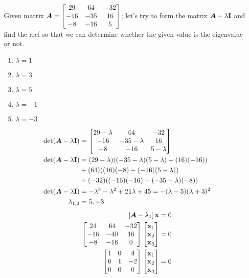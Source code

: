\documentclass{article}
\begin{document}
Given matrix $ \matr{A} = \begin{bmatrix} 29 & 64 & -32 \\ -16 & -35 & 16 \\ -8 & -16 & 5 \end{bmatrix} $; let's try to form the matrix $ \matr{A} - \lambda \vect{I} $ and find the rref so that we can determine whether the given value is the eigenvalue or not.
\begin{enumerate}[label = \textbf{\arabic*)}]
	\item $ \lambda = 1 $
	\item $ \lambda = 3 $
	\item $ \lambda = 5 $
	\item $ \lambda = -1 $
	\item $ \lambda = -3 $
\end{enumerate}
\hr
\begin{align*}
	\det( \matr{A} - \lambda \vect{I} ) & =
		\begin{bmatrix}
			29 - \lambda & 64 & -32 \\
			-16 & -35 - \lambda & 16 \\
			-8 & -16 & 5 - \lambda
		\end{bmatrix} \\
	\det( \matr{A} - \lambda \vect{I} )
		& = (29 - \lambda)( (-35 - \lambda)(5 - \lambda) - (16)(-16) ) \\
		& + (64)( (16)(-8) - (-16)(5 - \lambda) ) \\
		& + (-32)( (-16)(-16) - (-35 - \lambda)(-8) ) \\
	\det( \matr{A} - \lambda \vect{I} ) & =
		-\lambda^3 - \lambda^2 + 21\lambda + 45 = -(\lambda - 5)(\lambda + 3)^2 \\
	\lambda_{1,2} & = 5, -3
\end{align*}
\begin{align*}
	\left[ \matr{A} - \lambda_1 \right] \vect{x} & = 0 \\
	\begin{bmatrix}
		24 & 64 & -32 \\
		-16 & -40 & 16 \\
		-8 & -16 & 0
	\end{bmatrix}
	\begin{bmatrix} \vect{x}_1 \\ \vect{x}_2 \\ \vect{x}_3 \end{bmatrix} & = 0 \\
	\begin{bmatrix}
		1 & 0 & 4 \\
		0 & 1 & -2 \\
		0 & 0 & 0
	\end{bmatrix}
	\begin{bmatrix} \vect{x}_1 \\ \vect{x}_2 \\ \vect{x}_3 \end{bmatrix} & = 0
\end{align*}
\end{document}
